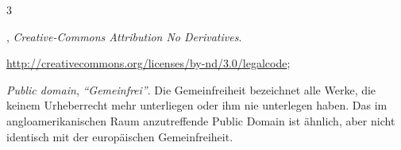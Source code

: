 \begin{WidePar}
\begin{multicols}{3}
\begin{description}
\begin{inparadesc}
\end{inparadesc}
\item[CC-BY-ND]
,
\emph{Creative-Commons Attribution No Derivatives}.
\begin{inparadesc}
  \item[Lizenztext (Link):]
  \url{http://creativecommons.org/licenses/by-nd/3.0/legalcode};
  \item[Kurzfassung (ohne Gewähr):] 
\end{inparadesc}
\item[PD]
\emph{Public domain}, \emph{"`Gemeinfrei"'}.
Die Gemeinfreiheit bezeichnet alle Werke, die keinem Urheberrecht mehr unterliegen
oder ihm nie unterlegen haben. Das im angloamerikanischen Raum anzutreffende
Public Domain ist ähnlich, aber nicht identisch mit der europäischen
Gemeinfreiheit.
\end{description}
\end{multicols}
\end{WidePar}